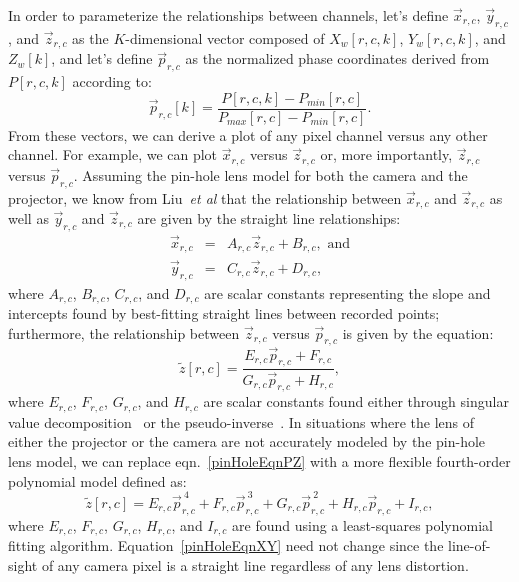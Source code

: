 \documentclass[]{spie}  %
\begin{document}
In order to parameterize the relationships between channels, let's define $\vec{x}_{r,c}$, $\vec{y}_{r,c}$, and $\vec{z}_{r,c}$ as the $K$-dimensional vector composed of $X_w[r,c,k]$, $Y_w[r,c,k]$, and $Z_w[k]$, and let's define $\vec{p}_{r,c}$ as the normalized phase coordinates derived from $P[r,c,k]$ according to:
\begin{equation}
\vec{p}_{r,c}[k] = \frac{P[r,c,k] - P_{min}[r,c]}{P_{max}[r,c] - P_{min}[r,c]}.
\end{equation}
From these vectors, we can derive a plot of any pixel channel versus any other channel.  For example, we can plot $\vec{x}_{r,c}$ versus $\vec{z}_{r,c}$ or, more importantly, $\vec{z}_{r,c}$ versus $\vec{p}_{r,c}$.  Assuming the pin-hole lens model for both the camera and the projector, we know from Liu~\textit{et al} that the relationship between $\vec{x}_{r,c}$ and $\vec{z}_{r,c}$ as well as $\vec{y}_{r,c}$ and $\vec{z}_{r,c}$ are given by the straight line relationships:
\begin{eqnarray}
\vec{x}_{r,c} & = & A_{r,c} \vec{z}_{r,c} + B_{r,c}, \mbox{ and} \\
\vec{y}_{r,c} & = & C_{r,c} \vec{z}_{r,c} + D_{r,c},
\label{pinHoleEqnXY}
\end{eqnarray}
where $A_{r,c}$, $B_{r,c}$, $C_{r,c}$, and $D_{r,c}$ are scalar constants representing the slope and intercepts found by best-fitting straight lines between recorded points; furthermore, the relationship between $\vec{z}_{r,c}$ versus $\vec{p}_{r,c}$ is given by the equation:
\begin{equation}
\tilde{z}[r,c] = \frac{E_{r,c} \vec{p}_{r,c} + F_{r,c}}{G_{r,c} \vec{p}_{r,c} + H_{r,c}},
\label{pinHoleEqnPZ}
\end{equation}
where $E_{r,c}$, $F_{r,c}$, $G_{r,c}$, and $H_{r,c}$ are scalar constants found either through singular value decomposition~\cite{??} or the pseudo-inverse~\cite{??}. In situations where the lens of either the projector or the camera are not accurately modeled by the pin-hole lens model, we can replace eqn.~\eqref{pinHoleEqnPZ} with a more flexible fourth-order polynomial model defined as:
\begin{equation}
\tilde{z}[r,c] = E_{r,c} \vec{p}_{r,c}^{~4} + F_{r,c} \vec{p}_{r,c}^{~3} + G_{r,c} \vec{p}_{r,c}^{~2} + H_{r,c} \vec{p}_{r,c} + I_{r,c},
\label{plyHoleEqn}
\end{equation}
where $E_{r,c}$, $F_{r,c}$, $G_{r,c}$, $H_{r,c}$, and $I_{r,c}$ are found using a least-squares polynomial fitting algorithm.  Equation~\eqref{pinHoleEqnXY} need not change since the line-of-sight of any camera pixel is a straight line regardless of any lens distortion.
\end{document}
